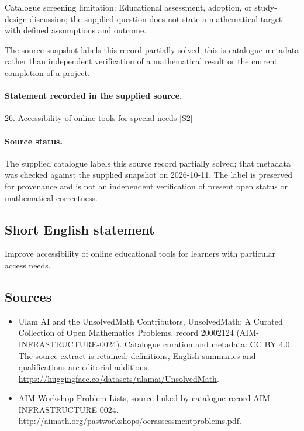 \documentclass[11pt]{article}
\begin{document}
Catalogue screening limitation: Educational assessment, adoption, or study-design discussion; the supplied question does not state a mathematical target with defined assumptions and outcome.

The source snapshot labels this record partially solved; this is catalogue metadata rather than independent verification of a mathematical result or the current completion of a project.
\paragraph{Statement recorded in the supplied source.}
26. Accessibility of online tools for special needs \href{http://aimath.org/pastworkshops/oerassessmentproblems.pdf}{[S2]}
\paragraph{Source status.}
The supplied catalogue labels this source record partially solved; that metadata was checked against the supplied snapshot on 2026-10-11. The label is preserved for provenance and is not an independent verification of present open status or mathematical correctness.
\subsection{Short English statement}
Improve accessibility of online educational tools for learners with particular access needs.
\subsection{Sources}
\begin{itemize}
\item[S1] Ulam AI and the UnsolvedMath Contributors, UnsolvedMath: A Curated Collection of Open Mathematics Problems, record 20002124 (AIM-INFRASTRUCTURE-0024). Catalogue curation and metadata: CC BY 4.0. The source extract is retained; definitions, English summaries and qualifications are editorial additions.
\url{https://huggingface.co/datasets/ulamai/UnsolvedMath}.
\item[S2] AIM Workshop Problem Lists, source linked by catalogue record AIM-INFRASTRUCTURE-0024.
\url{http://aimath.org/pastworkshops/oerassessmentproblems.pdf}.
\end{itemize}
\end{document}
